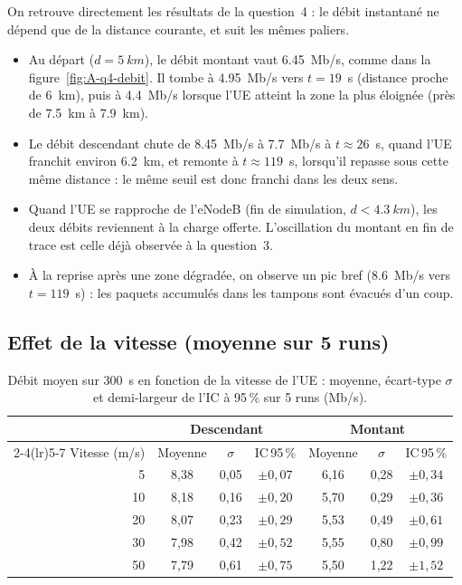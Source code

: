 On retrouve directement les résultats de la question~4 : le débit instantané ne
dépend que de la distance courante, et suit les mêmes paliers.
\begin{itemize}[nosep]
\item Au départ ($d=\SI{5}{km}$), le débit montant vaut \SI{6.45}{Mb/s}, comme
dans la figure~\ref{fig:A-q4-debit}. Il tombe à \SI{4.95}{Mb/s} vers $t=19$~s
(distance proche de \SI{6}{km}), puis à \SI{4.4}{Mb/s} lorsque l'UE atteint la
zone la plus éloignée (près de \SI{7.5}{km} à \SI{7.9}{km}).
\item Le débit descendant chute de \SI{8.45}{Mb/s} à \SI{7.7}{Mb/s} à $t\approx26$~s,
quand l'UE franchit environ \SI{6.2}{km}, et remonte à $t\approx119$~s, lorsqu'il
repasse sous cette même distance : le même seuil est donc franchi dans les deux
sens.
\item Quand l'UE se rapproche de l'eNodeB (fin de simulation, $d<\SI{4.3}{km}$),
les deux débits reviennent à la charge offerte. L'oscillation du montant en fin
de trace est celle déjà observée à la question~3.
\item À la reprise après une zone dégradée, on observe un pic bref
(\SI{8.6}{Mb/s} vers $t=119$~s) : les paquets accumulés dans les tampons sont
évacués d'un coup.
\end{itemize}

\subsection{Effet de la vitesse (moyenne sur 5 runs)}



\begin{table}[H]
\centering
\caption{Débit moyen sur \SI{300}{s} en fonction de la vitesse de l'UE :
moyenne, écart-type $\sigma$ et demi-largeur de l'IC à 95\,\% sur 5 runs
(Mb/s).}
\label{tab:A-q5}
\small
\begin{tabular}{rcccccc}
\toprule
 & \multicolumn{3}{c}{Descendant} & \multicolumn{3}{c}{Montant} \\
\cmidrule(lr){2-4}\cmidrule(lr){5-7}
Vitesse (m/s) & Moyenne & $\sigma$ & IC\,95\,\% & Moyenne & $\sigma$ & IC\,95\,\% \\
\midrule
5  & 8,38 & 0,05 & $\pm 0{,}07$ & 6,16 & 0,28 & $\pm 0{,}34$ \\
10 & 8,18 & 0,16 & $\pm 0{,}20$ & 5,70 & 0,29 & $\pm 0{,}36$ \\
20 & 8,07 & 0,23 & $\pm 0{,}29$ & 5,53 & 0,49 & $\pm 0{,}61$ \\
30 & 7,98 & 0,42 & $\pm 0{,}52$ & 5,55 & 0,80 & $\pm 0{,}99$ \\
50 & 7,79 & 0,61 & $\pm 0{,}75$ & 5,50 & 1,22 & $\pm 1{,}52$ \\
\bottomrule
\end{tabular}
\end{table}

